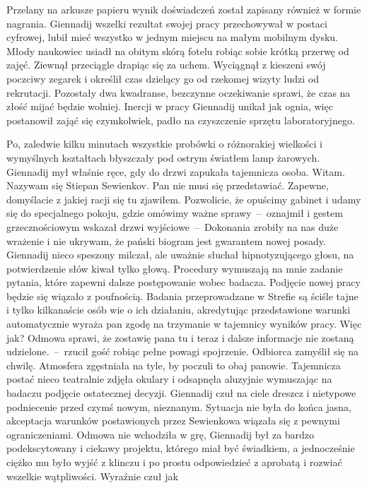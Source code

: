 \documentclass[../MAIN.tex]{subfiles}
\begin{document}
Przelany na arkusze papieru wynik doświadczeń został zapisany
również w formie nagrania. Giennadij wszelki rezultat swojej
pracy przechowywał w postaci cyfrowej, lubił mieć wszystko w
jednym miejscu na małym mobilnym dysku. Młody naukowiec usiadł
na obitym skórą fotelu robiąc sobie krótką przerwę od zajęć.
Ziewnął przeciągle drapiąc się za uchem. Wyciągnął z kieszeni
swój poczciwy zegarek i określił czas dzielący go od rzekomej
wizyty ludzi od rekrutacji. Pozostały dwa kwadranse, bezczynne
oczekiwanie sprawi, że czas na złość mijać będzie wolniej.
Inercji w pracy Giennadij unikał jak ognia, więc postanowił
zająć się czymkolwiek, padło na czyszczenie sprzętu
laboratoryjnego.

Po, zaledwie kilku minutach wszystkie probówki o różnorakiej
wielkości i wymyślnych kształtach błyszczały pod ostrym
światłem lamp żarowych. Giennadij mył właśnie ręce, gdy do
drzwi zapukała tajemnicza osoba.
%
\sx Witam. Nazywam się Stiepan Sewienkov. Pan nie musi się
przedstawiać. Zapewne, domyślacie z jakiej racji się tu
zjawiłem. Pozwolicie, że opuścimy gabinet i udamy się do
specjalnego pokoju, gdzie omówimy ważne sprawy~--~oznajmił i
gestem grzecznościowym wskazał drzwi wyjściowe~--~Dokonania
zrobiły na nas duże wrażenie i nie ukrywam, że pański biogram
jest gwarantem nowej posady.\\
Giennadij nieco speszony milczał, ale uważnie słuchał
hipnotyzującego głosu, na potwierdzenie słów kiwał tylko głową.
\xx Procedury wymuszają na mnie zadanie pytania, które zapewni
dalsze postępowanie wobec badacza. Podjęcie nowej pracy będzie
się wiązało z poufnością. Badania przeprowadzane w Strefie są
ściśle tajne i tylko kilkanaście osób wie o ich działaniu,
akredytując przedstawione warunki automatycznie wyraża pan
zgodę na trzymanie w tajemnicy wyników pracy. Więc jak? Odmowa
sprawi, że zostawię pana tu i teraz i dalsze informacje nie
zostaną udzielone.~--~rzucił gość robiąc pełne powagi
spojrzenie.
Odbiorca zamyślił się na chwilę. Atmosfera zgęstniała na tyle,
by poczuli to obaj panowie. Tajemnicza postać nieco teatralnie
zdjęła okulary i odsapnęła aluzyjnie wymuszając na badaczu
podjęcie ostatecznej decyzji. Giennadij czuł na ciele dreszcz i
nietypowe podniecenie przed czymś nowym, nieznanym. Sytuacja
nie była do końca jasna, akceptacja warunków postawionych przez
Sewienkowa wiązała się z pewnymi ograniczeniami. Odmowa nie
wchodziła w grę, Giennadij był za bardzo podekscytowany i
ciekawy projektu, którego miał być świadkiem, a jednocześnie
ciężko mu było wyjść z klinczu i po prostu odpowiedzieć z
aprobatą i rozwiać wszelkie wątpliwości. Wyraźnie czuł jak
\end{document}
